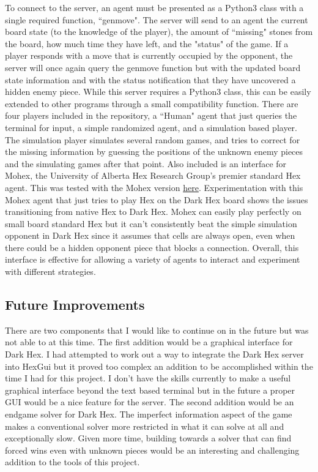 \documentclass[11pt]{article}
\begin{document}
To connect to the server, an agent must be presented as a Python3 class with a single required function, ``genmove".
The server will send to an agent the current board state (to the knowledge of the player), the amount of ``missing" stones from the board, how much time they have left, and the "status" of the game.
If a player responds with a move that is currently occupied by the opponent, the server will once again query the genmove function but with the updated board state information and with the status notification that they have uncovered a hidden enemy piece.
While this server requires a Python3 class, this can be easily extended to other programs through a small compatibility function.
There are four players included in the repository, a ``Human" agent that just queries the terminal for input, a simple randomized agent, and a simulation based player.
The simulation player simulates several random games, and tries to correct for the missing information by guessing the positions of the unknown enemy pieces and the simulating games after that point.
Also included is an interface for Mohex, the University of Alberta Hex Research Group's premier standard Hex agent.
This was tested with the Mohex version \href{https://github.com/cgao3/benzene-vanilla-cmake}{here}.
Experimentation with this Mohex agent that just tries to play Hex on the Dark Hex board shows the issues transitioning from native Hex to Dark Hex.
Mohex can easily play perfectly on small board standard Hex but it can't consistently beat the simple simulation opponent in Dark Hex since it assumes that cells are always open, even when there could be a hidden opponent piece that blocks a connection.
Overall, this interface is effective for allowing a variety of agents to interact and experiment with different strategies.

\subsection*{Future Improvements}

There are two components that I would like to continue on in the future but was not able to at this time.
The first addition would be a graphical interface for Dark Hex.
I had attempted to work out a way to integrate the Dark Hex server into HexGui but it proved too complex an addition to be accomplished within the time I had for this project.
I don't have the skills currently to make a useful graphical interface beyond the text based terminal but in the future a proper GUI would be a nice feature for the server.
The second addition would be an endgame solver for Dark Hex.
The imperfect information aspect of the game makes a conventional solver more restricted in what it can solve at all and exceptionally slow.
Given more time, building towards a solver that can find forced wins even with unknown pieces would be an interesting and challenging addition to the tools of this project.
\end{document}
